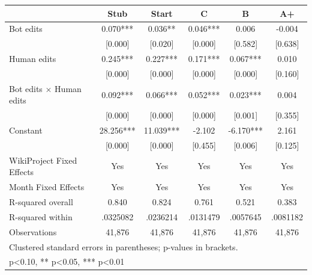 {
\def\sym#1{\ifmmode^{#1}\else\(^{#1}\)\fi}
\begin{tabular}{l*{5}{c}}
\toprule
                    &\multicolumn{1}{c}{Stub}&\multicolumn{1}{c}{Start}&\multicolumn{1}{c}{C}&\multicolumn{1}{c}{B}&\multicolumn{1}{c}{A+}\\
\midrule
Bot edits           &     0.070***&     0.036** &     0.046***&     0.006   &    -0.004   \\
                    &   [0.000]   &   [0.020]   &   [0.000]   &   [0.582]   &   [0.638]   \\
Human edits         &     0.245***&     0.227***&     0.171***&     0.067***&     0.010   \\
                    &   [0.000]   &   [0.000]   &   [0.000]   &   [0.000]   &   [0.160]   \\
Bot edits $\times$ Human edits&     0.092***&     0.066***&     0.052***&     0.023***&     0.004   \\
                    &   [0.000]   &   [0.000]   &   [0.000]   &   [0.001]   &   [0.355]   \\
Constant            &    28.256***&    11.039***&    -2.102   &    -6.170***&     2.161   \\
                    &   [0.000]   &   [0.000]   &   [0.455]   &   [0.006]   &   [0.125]   \\
WikiProject Fixed Effects&       Yes   &       Yes   &       Yes   &       Yes   &       Yes   \\
Month Fixed Effects &       Yes   &       Yes   &       Yes   &       Yes   &       Yes   \\
\midrule
R-squared overall   &     0.840   &     0.824   &     0.761   &     0.521   &     0.383   \\
R-squared within    &  .0325082   &  .0236214   &  .0131479   &  .0057645   &  .0081182   \\
Observations        &    41,876   &    41,876   &    41,876   &    41,876   &    41,876   \\
\bottomrule
\multicolumn{6}{l}{\footnotesize Clustered standard errors in parentheses; p-values in brackets.}\\
\multicolumn{6}{l}{\footnotesize * p<0.10, ** p<0.05, *** p<0.01}\\
\end{tabular}
}
